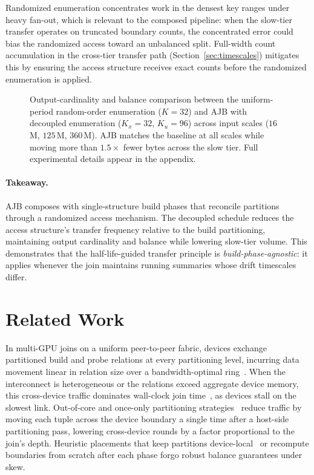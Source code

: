\documentclass{article}
\begin{document}
Randomized enumeration concentrates work in the densest key ranges under heavy
fan-out, which is relevant to the composed pipeline: when the slow-tier transfer
operates on truncated boundary counts, the concentrated error could bias the
randomized access toward an unbalanced split. Full-width count accumulation in
the cross-tier transfer path (Section~\ref{sec:timescales}) mitigates this by
ensuring the access structure receives exact counts before the randomized
enumeration is applied.

\begin{figure}[t]
\centering
\caption{Output-cardinality and balance comparison between the uniform-period
random-order enumeration ($K = 32$) and AJB with decoupled enumeration ($K_x =
32$, $K_u = 96$) across input scales ($16$\,M, $125$\,M, $360$\,M). AJB matches
the baseline at all scales while moving more than $\mathbf{1.5\times}$ fewer
bytes across the slow tier. Full experimental details appear in the appendix.}
\label{fig:muon}
\end{figure}

\paragraph{Takeaway.}
AJB composes with single-structure build phases that reconcile partitions through
a randomized access mechanism. The decoupled schedule reduces the access
structure's transfer frequency relative to the build partitioning, maintaining
output cardinality and balance while lowering slow-tier volume. This demonstrates
that the half-life-guided transfer principle is \emph{build-phase-agnostic}: it
applies whenever the join maintains running summaries whose drift timescales
differ.

\section{Related Work}
\label{sec:related}

In multi-GPU joins on a uniform peer-to-peer fabric, devices exchange
partitioned build and probe relations at every partitioning level, incurring
data movement linear in relation size over a bandwidth-optimal
ring~\citep{maltry2025multigpu,rui2020efficient}. When the interconnect is
heterogeneous or the relations exceed aggregate device memory, this cross-device
traffic dominates wall-clock join time~\citep{paul2021revisiting}, as devices
stall on the slowest link. Out-of-core and once-only partitioning
strategies~\citep{kim2009sortvshash,balkesen2013multicore} reduce traffic by
moving each tuple across the device boundary a single time after a host-side
partitioning pass, lowering cross-device rounds by a factor proportional to the
join's depth. Heuristic placements that keep partitions
device-local~\citep{DeWitt1992practical} or recompute boundaries from scratch
after each phase forgo robust balance guarantees under skew.
\end{document}
